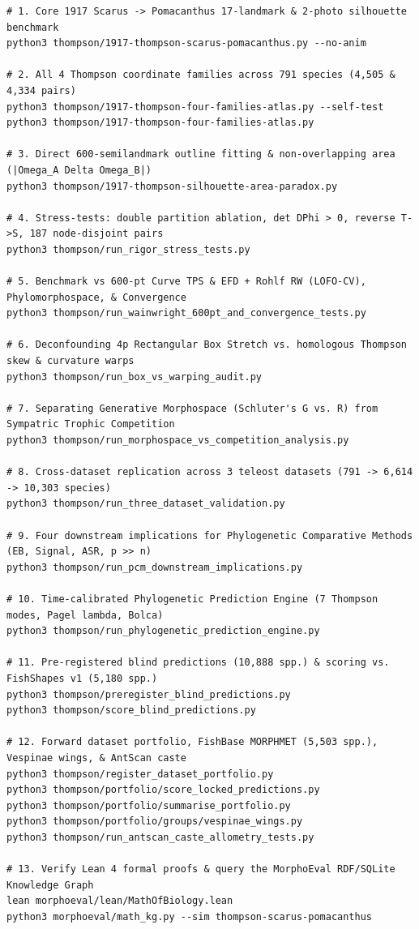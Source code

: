 \documentclass[10.5pt,a4paper]{article}
\begin{document}
{\footnotesize
\begin{verbatim}
# 1. Core 1917 Scarus -> Pomacanthus 17-landmark & 2-photo silhouette benchmark
python3 thompson/1917-thompson-scarus-pomacanthus.py --no-anim

# 2. All 4 Thompson coordinate families across 791 species (4,505 & 4,334 pairs)
python3 thompson/1917-thompson-four-families-atlas.py --self-test
python3 thompson/1917-thompson-four-families-atlas.py

# 3. Direct 600-semilandmark outline fitting & non-overlapping area (|Omega_A Delta Omega_B|)
python3 thompson/1917-thompson-silhouette-area-paradox.py

# 4. Stress-tests: double partition ablation, det DPhi > 0, reverse T->S, 187 node-disjoint pairs
python3 thompson/run_rigor_stress_tests.py

# 5. Benchmark vs 600-pt Curve TPS & EFD + Rohlf RW (LOFO-CV), Phylomorphospace, & Convergence
python3 thompson/run_wainwright_600pt_and_convergence_tests.py

# 6. Deconfounding 4p Rectangular Box Stretch vs. homologous Thompson skew & curvature warps
python3 thompson/run_box_vs_warping_audit.py

# 7. Separating Generative Morphospace (Schluter's G vs. R) from Sympatric Trophic Competition
python3 thompson/run_morphospace_vs_competition_analysis.py

# 8. Cross-dataset replication across 3 teleost datasets (791 -> 6,614 -> 10,303 species)
python3 thompson/run_three_dataset_validation.py

# 9. Four downstream implications for Phylogenetic Comparative Methods (EB, Signal, ASR, p >> n)
python3 thompson/run_pcm_downstream_implications.py

# 10. Time-calibrated Phylogenetic Prediction Engine (7 Thompson modes, Pagel lambda, Bolca)
python3 thompson/run_phylogenetic_prediction_engine.py

# 11. Pre-registered blind predictions (10,888 spp.) & scoring vs. FishShapes v1 (5,180 spp.)
python3 thompson/preregister_blind_predictions.py
python3 thompson/score_blind_predictions.py

# 12. Forward dataset portfolio, FishBase MORPHMET (5,503 spp.), Vespinae wings, & AntScan caste
python3 thompson/register_dataset_portfolio.py
python3 thompson/portfolio/score_locked_predictions.py
python3 thompson/portfolio/summarise_portfolio.py
python3 thompson/portfolio/groups/vespinae_wings.py
python3 thompson/run_antscan_caste_allometry_tests.py

# 13. Verify Lean 4 formal proofs & query the MorphoEval RDF/SQLite Knowledge Graph
lean morphoeval/lean/MathOfBiology.lean
python3 morphoeval/math_kg.py --sim thompson-scarus-pomacanthus
\end{verbatim}
}
\end{document}
